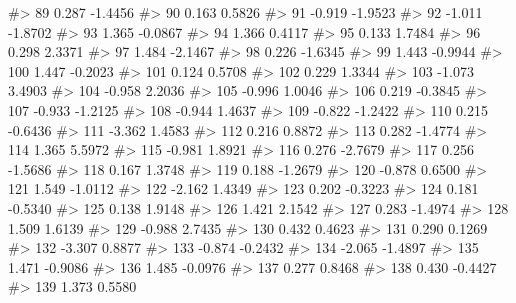 \documentclass[
  letterpaper,
]{krantz}
\makeatletter
\newenvironment{Shaded}{\begin{snugshade}}{\end{snugshade}}
\newcommand{\CommentTok}[1]{\textcolor[rgb]{0.37,0.37,0.37}{#1}}
\newenvironment{kframe}{%
\medskip{}
\setlength{\fboxsep}{.8em}
 \def\at@end@of@kframe{}%
 \ifinner\ifhmode%
  \def\at@end@of@kframe{\end{minipage}}%
  \begin{minipage}{\columnwidth}%
 \fi\fi%
 \def\FrameCommand##1{\hskip\@totalleftmargin \hskip-\fboxsep
 \colorbox{shadecolor}{##1}\hskip-\fboxsep
     \hskip-\linewidth \hskip-\@totalleftmargin \hskip\columnwidth}%
 \MakeFramed {\advance\hsize-\width
   \@totalleftmargin\z@ \linewidth\hsize
   \@setminipage}}%
 {\par\unskip\endMakeFramed%
 \at@end@of@kframe}
\renewenvironment{Shaded}{\begin{kframe}}{\end{kframe}}
\makeatother
\begin{document}
\begin{Shaded}
\begin{Highlighting}[]
\CommentTok{\#\textgreater{} 89    0.287 {-}1.4456}
\CommentTok{\#\textgreater{} 90    0.163  0.5826}
\CommentTok{\#\textgreater{} 91   {-}0.919 {-}1.9523}
\CommentTok{\#\textgreater{} 92   {-}1.011 {-}1.8702}
\CommentTok{\#\textgreater{} 93    1.365 {-}0.0867}
\CommentTok{\#\textgreater{} 94    1.366  0.4117}
\CommentTok{\#\textgreater{} 95    0.133  1.7484}
\CommentTok{\#\textgreater{} 96    0.298  2.3371}
\CommentTok{\#\textgreater{} 97    1.484 {-}2.1467}
\CommentTok{\#\textgreater{} 98    0.226 {-}1.6345}
\CommentTok{\#\textgreater{} 99    1.443 {-}0.9944}
\CommentTok{\#\textgreater{} 100   1.447 {-}0.2023}
\CommentTok{\#\textgreater{} 101   0.124  0.5708}
\CommentTok{\#\textgreater{} 102   0.229  1.3344}
\CommentTok{\#\textgreater{} 103  {-}1.073  3.4903}
\CommentTok{\#\textgreater{} 104  {-}0.958  2.2036}
\CommentTok{\#\textgreater{} 105  {-}0.996  1.0046}
\CommentTok{\#\textgreater{} 106   0.219 {-}0.3845}
\CommentTok{\#\textgreater{} 107  {-}0.933 {-}1.2125}
\CommentTok{\#\textgreater{} 108  {-}0.944  1.4637}
\CommentTok{\#\textgreater{} 109  {-}0.822 {-}1.2422}
\CommentTok{\#\textgreater{} 110   0.215 {-}0.6436}
\CommentTok{\#\textgreater{} 111  {-}3.362  1.4583}
\CommentTok{\#\textgreater{} 112   0.216  0.8872}
\CommentTok{\#\textgreater{} 113   0.282 {-}1.4774}
\CommentTok{\#\textgreater{} 114   1.365  5.5972}
\CommentTok{\#\textgreater{} 115  {-}0.981  1.8921}
\CommentTok{\#\textgreater{} 116   0.276 {-}2.7679}
\CommentTok{\#\textgreater{} 117   0.256 {-}1.5686}
\CommentTok{\#\textgreater{} 118   0.167  1.3748}
\CommentTok{\#\textgreater{} 119   0.188 {-}1.2679}
\CommentTok{\#\textgreater{} 120  {-}0.878  0.6500}
\CommentTok{\#\textgreater{} 121   1.549 {-}1.0112}
\CommentTok{\#\textgreater{} 122  {-}2.162  1.4349}
\CommentTok{\#\textgreater{} 123   0.202 {-}0.3223}
\CommentTok{\#\textgreater{} 124   0.181 {-}0.5340}
\CommentTok{\#\textgreater{} 125   0.138  1.9148}
\CommentTok{\#\textgreater{} 126   1.421  2.1542}
\CommentTok{\#\textgreater{} 127   0.283 {-}1.4974}
\CommentTok{\#\textgreater{} 128   1.509  1.6139}
\CommentTok{\#\textgreater{} 129  {-}0.988  2.7435}
\CommentTok{\#\textgreater{} 130   0.432  0.4623}
\CommentTok{\#\textgreater{} 131   0.290  0.1269}
\CommentTok{\#\textgreater{} 132  {-}3.307  0.8877}
\CommentTok{\#\textgreater{} 133  {-}0.874 {-}0.2432}
\CommentTok{\#\textgreater{} 134  {-}2.065 {-}1.4897}
\CommentTok{\#\textgreater{} 135   1.471 {-}0.9086}
\CommentTok{\#\textgreater{} 136   1.485 {-}0.0976}
\CommentTok{\#\textgreater{} 137   0.277  0.8468}
\CommentTok{\#\textgreater{} 138   0.430 {-}0.4427}
\CommentTok{\#\textgreater{} 139   1.373  0.5580}

\end{Highlighting}
\end{Shaded}
\end{document}
